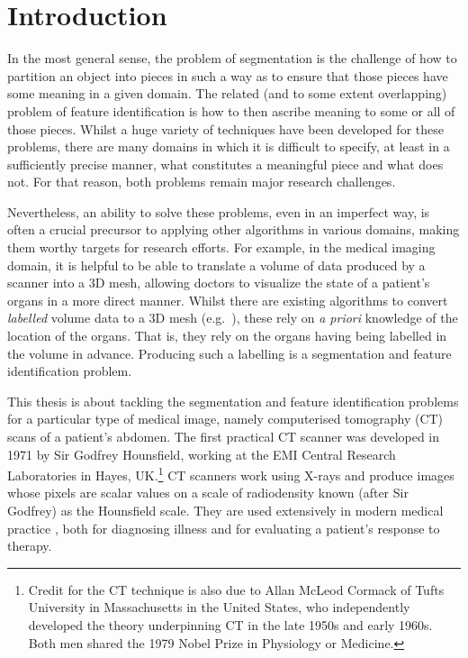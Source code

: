 \chapter{Introduction}
\label{chap:introduction}

In the most general sense, the problem of segmentation is the challenge of how to partition an object into pieces in such a way as to ensure that those pieces have some meaning in a given domain. The related (and to some extent overlapping) problem of feature identification is how to then ascribe meaning to some or all of those pieces. Whilst a huge variety of techniques have been developed for these problems, there are many domains in which it is difficult to specify, at least in a sufficiently precise manner, what constitutes a meaningful piece and what does not. For that reason, both problems remain major research challenges.

Nevertheless, an ability to solve these problems, even in an imperfect way, is often a crucial precursor to applying other algorithms in various domains, making them worthy targets for research efforts. For example, in the medical imaging domain, it is helpful to be able to translate a volume of data produced by a scanner into a 3D mesh, allowing doctors to visualize the state of a patient's organs in a more direct manner. Whilst there are existing algorithms to convert \emph{labelled} volume data to a 3D mesh (e.g.~\cite{wu03}), these rely on \emph{a priori} knowledge of the location of the organs. That is, they rely on the organs having being labelled in the volume in advance. Producing such a labelling is a segmentation and feature identification problem.

This thesis is about tackling the segmentation and feature identification problems for a particular type of medical image, namely computerised tomography (CT) scans of a patient's abdomen. The first practical CT scanner was developed in 1971 by Sir Godfrey Hounsfield, working at the EMI Central Research Laboratories in Hayes, UK.\footnote{Credit for the CT technique is also due to Allan McLeod Cormack of Tufts University in Massachusetts in the United States, who independently developed the theory underpinning CT in the late 1950s and early 1960s. Both men shared the 1979 Nobel Prize in Physiology or Medicine.} CT scanners work using X-rays and produce images whose pixels are scalar values on a scale of radiodensity known (after Sir Godfrey) as the Hounsfield scale. They are used extensively in modern medical practice \cite{garvey02}, both for diagnosing illness and for evaluating a patient's response to therapy.

